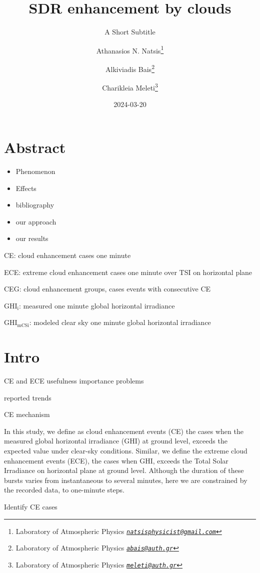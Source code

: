 \documentclass[
]{article}
\title{SDR enhancement by clouds}
\subtitle{A Short Subtitle}
\author{Athanasios N. Natsis\footnote{Laboratory of Atmospheric Physics \emph{\href{mailto:natsisphysicist@gmail.com}{\nolinkurl{natsisphysicist@gmail.com}}}} \and Alkiviadis Bais\footnote{Laboratory of Atmospheric Physics \emph{\href{mailto:abais@auth.gr}{\nolinkurl{abais@auth.gr}}}} \and Charikleia Meleti\footnote{Laboratory of Atmospheric Physics \emph{\href{mailto:meleti@auth.gr}{\nolinkurl{meleti@auth.gr}}}}}
\date{2024-03-20}
\providecommand{\tightlist}{%
  \setlength{\itemsep}{0pt}\setlength{\parskip}{0pt}}
\begin{document}
\maketitle

{
\setcounter{tocdepth}{4}
\tableofcontents
}
\hypertarget{abstract}{%
\section*{Abstract}\label{abstract}}

\begin{itemize}
\tightlist
\item
  Phenomenon
\item
  Effects
\item
  bibliography
\item
  our approach
\item
  our results
\end{itemize}

CE: cloud enhancement cases one minute

ECE: extreme cloud enhancement cases one minute over TSI on horizontal plane

CEG: cloud enhancement groups, cases events with consecutive CE

\(\text{GHI}_\text{i}\): measured one minute global horizontal irradiance

\(\text{GHI}_\text{mCSi}\): modeled clear sky one minute global horizontal irradiance

\hypertarget{intro}{%
\section{Intro}\label{intro}}

CE and ECE usefulness
importance
problems

reported trends

CE mechanism

In this study, we define as cloud enhancement events (CE) the cases when the measured
global horizontal irradiance (GHI) at ground level, exceeds the expected value under
clear-sky conditions.
Similar, we define the extreme cloud enhancement events (ECE), the cases when GHI,
exceeds the Total Solar Irradiance on horizontal plane at ground level.
Although the duration of these bursts varies from instantaneous to several minutes,
here we are constrained by the recorded data, to one-minute steps.

Identify CE cases
\end{document}
